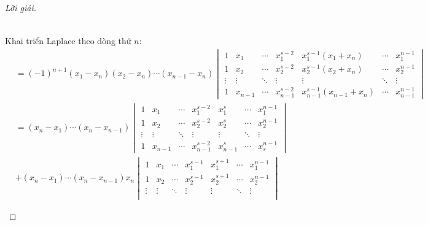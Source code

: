 \documentclass[class=nhvh-linear-algebra,crop=false]{standalone}
\begin{document}
\begin{proof}[Lời giải]
\begin{enumerate}[label = (\alph*)]
\begin{align*}
              \end{align*}
              \par Khai triển Laplace theo dòng thứ $n$:
              \begin{align*}
                   & = {(-1)}^{n+1}(x_{1} - x_{n})(x_{2} - x_{n})\cdots (x_{n-1} - x_{n})
                  \begin{vmatrix}
                      1      & x_{1}   & \cdots & x_{1}^{s-2}   & x_{1}^{s-1}(x_{1} + x_{n})     & \cdots & x_{1}^{n-1}   \\
                      1      & x_{2}   & \cdots & x_{2}^{s-2}   & x_{2}^{s-1}(x_{2} + x_{n})     & \cdots & x_{2}^{n-1}   \\
                      \vdots & \vdots  & \ddots & \vdots        & \vdots                         & \ddots & \vdots        \\
                      1      & x_{n-1} & \cdots & x_{n-1}^{s-2} & x_{n-1}^{s-1}(x_{n-1} + x_{n}) & \cdots & x_{n-1}^{n-1}
                  \end{vmatrix}                                                    \\
                   & = (x_{n} - x_{1})\cdots (x_{n} - x_{n-1})
                  \begin{vmatrix}
                      1      & x_{1}   & \cdots & x_{1}^{s-2}   & x_{1}^{s}   & \cdots & x_{1}^{n-1} \\
                      1      & x_{2}   & \cdots & x_{2}^{s-2}   & x_{2}^{s}   & \cdots & x_{2}^{n-1} \\
                      \vdots & \vdots  & \ddots & \vdots        & \vdots      & \ddots & \vdots      \\
                      1      & x_{n-1} & \cdots & x_{n-1}^{s-2} & x_{n-1}^{s} & \cdots & x_{s}^{n-1}
                  \end{vmatrix}                                                                         \\
                   & + (x_{n} - x_{1})\cdots (x_{n} - x_{n-1})
                  x_{n}\begin{vmatrix}
                           1      & x_{1}   & \cdots & x_{1}^{s-1}   & x_{1}^{s+1}   & \cdots & x_{1}^{n-1} \\
                           1      & x_{2}   & \cdots & x_{2}^{s-1}   & x_{2}^{s+1}   & \cdots & x_{2}^{n-1} \\
                           \vdots & \vdots  & \ddots & \vdots        & \vdots        & \ddots & \vdots      \\

\end{vmatrix}
\end{align*}
\end{enumerate}
\end{proof}
\end{document}
